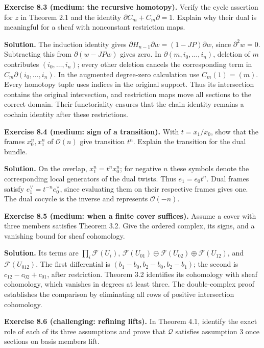 \documentclass[11pt]{article}
\begin{document}
\textbf{Exercise 8.3 (medium: the recursive homotopy).} Verify the cycle
assertion for \(z\) in Theorem 2.1 and the identity
\(\partial C_m+C_m\partial=1\). Explain why their dual is meaningful for
a sheaf with nonconstant restriction maps.

\textbf{Solution.} The induction identity gives
\(\partial H_{n-1}\partial w=(1-JP)\partial w\), since
\(\partial^2w=0\). Subtracting this from \(\partial(w-JPw)\) gives zero.
In \(\partial(m,i_0,\ldots,i_n)\), deletion of \(m\) contributes
\((i_0,\ldots,i_n)\); every other deletion cancels the corresponding
term in \(C_m\partial(i_0,\ldots,i_n)\). In the augmented degree-zero
calculation use \(C_m(1)=(m)\). Every homotopy tuple uses indices in the
original support. Thus its intersection contains the original
intersection, and restriction maps move all sections to the correct
domain. Their functoriality ensures that the chain identity remains a
cochain identity after these restrictions.

\textbf{Exercise 8.4 (medium: sign of a transition).} With
\(t=x_1/x_0\), show that the frames \(x_0^n,x_1^n\) of \(\mathcal O(n)\)
give transition \(t^n\). Explain the transition for the dual bundle.

\textbf{Solution.} On the overlap, \(x_1^n=t^n x_0^n\); for negative
\(n\) these symbols denote the corresponding local generators of the
dual twists. Thus \(e_1=e_0t^n\). Dual frames satisfy
\(e_1^\vee=t^{-n}e_0^\vee\), since evaluating them on their respective
frames gives one. The dual cocycle is the inverse and represents
\(\mathcal O(-n)\).

\textbf{Exercise 8.5 (medium: when a finite cover suffices).} Assume a
cover with three members satisfies Theorem 3.2. Give the ordered
complex, its signs, and a vanishing bound for sheaf cohomology.

\textbf{Solution.} Its terms are \(\prod_i\mathcal F(U_i)\),
\(\mathcal F(U_{01})\oplus\mathcal F(U_{02})\oplus\mathcal F(U_{12})\),
and \(\mathcal F(U_{012})\). The first differential is
\((b_1-b_0,b_2-b_0,b_2-b_1)\); the second is \(c_{12}-c_{02}+c_{01}\),
after restriction. Theorem 3.2 identifies its cohomology with sheaf
cohomology, which vanishes in degrees at least three. The double-complex
proof establishes the comparison by eliminating all rows of positive
intersection cohomology.

\textbf{Exercise 8.6 (challenging: refining lifts).} In Theorem 4.1,
identify the exact role of each of its three assumptions and prove that
\(\mathcal Q\) satisfies assumption 3 once sections on basis members
lift.
\end{document}
